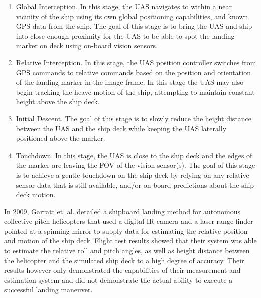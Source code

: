 \documentclass[12pt, letterpaper]{article}
\begin{document}
\begin{enumerate}
\item Global Interception.  In this stage, the UAS navigates to within a near vicinity of the ship using its own global positioning capabilities, and known GPS data from the ship.  The goal of this stage is to bring the UAS and ship into close enough proximity for the UAS to be able to spot the landing marker on deck using on-board vision sensors.
\item Relative Interception.  In this stage, the UAS position controller switches from GPS commands to relative commands based on the position and orientation of the landing marker in the image frame.  In this stage the UAS may also begin tracking the heave motion of the ship, attempting to maintain constant height above the ship deck.
\item Initial Descent.  The goal of this stage is to slowly reduce the height distance between the UAS and the ship deck while keeping the UAS laterally positioned above the marker.
\item Touchdown. In this stage, the UAS is close to the ship deck and the edges of the marker are leaving the FOV of the vision sensor(s).  The goal of this stage is to achieve a gentle touchdown on the ship deck by relying on any relative sensor data that is still available, and/or on-board predictions about the ship deck motion.
\end{enumerate}


In 2009, Garratt et. al. \cite{Garratt2009} detailed a shipboard landing method for autonomous collective pitch helicopters that used a digital IR camera and a laser range finder pointed at a spinning mirror to supply data for estimating the relative position and motion of the ship deck.  Flight test results showed that their system was able to estimate the relative roll and pitch angles, as well as height distance between the helicopter and the simulated ship deck to a high degree of accuracy.  Their results however only demonstrated the capabilities of their measurement and estimation system and did not demonstrate the actual ability to execute a successful landing maneuver.
  
\end{document}
